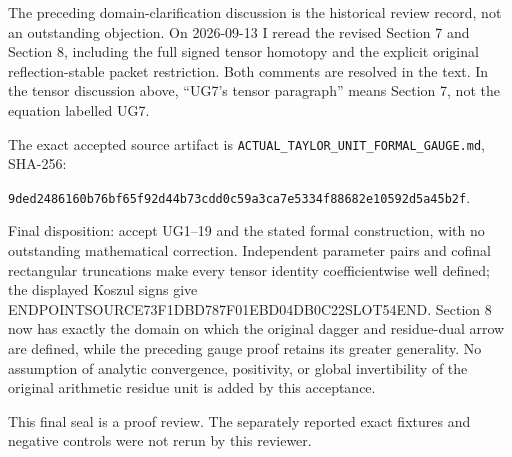 The preceding domain-clarification discussion is the historical review record, not an outstanding objection. On 2026-09-13 I reread the revised Section 7 and Section 8, including the full signed tensor homotopy and the explicit original reflection-stable packet restriction. Both comments are resolved in the text. In the tensor discussion above, ``UG7's tensor paragraph'' means Section 7, not the equation labelled UG7.

The exact accepted source artifact is \texttt{ACTUAL\_TAYLOR\_UNIT\_FORMAL\_GAUGE.md}, SHA-256:

\texttt{9ded2486160b76bf65f92d44b73cdd0c59a3ca7e5334f88682e10592d5a45b2f}.

Final disposition: accept UG1--19 and the stated formal construction, with no outstanding mathematical correction. Independent parameter pairs and cofinal rectangular truncations make every tensor identity coefficientwise well defined; the displayed Koszul signs give ENDPOINTSOURCE73F1DBD787F01EBD04DB0C22SLOT54END. Section 8 now has exactly the domain on which the original dagger and residue-dual arrow are defined, while the preceding gauge proof retains its greater generality. No assumption of analytic convergence, positivity, or global invertibility of the original arithmetic residue unit is added by this acceptance.

This final seal is a proof review. The separately reported exact fixtures and negative controls were not rerun by this reviewer.
